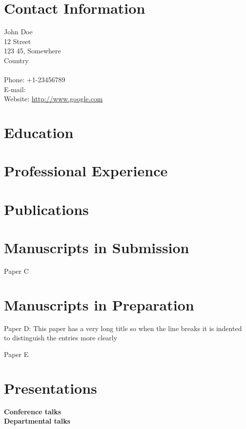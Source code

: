 \documentclass[12pt]{karencv}
\begin{document}
\section{Contact Information}
John Doe\\
12 Street\\
123 45, Somewhere~\\
Country\\~\\
Phone: +1-23456789\\
E-mail: \\
Website: \url{http://www.google.com}


\section{Education}

\section{Professional Experience}

\section{Publications}



\section{Manuscripts in Submission}
Paper C
\section{Manuscripts in Preparation}

\begin{articlelist}
\item Paper D: This paper has a very long title so when the line breaks it is indented to distinguish the entries more clearly
\item Paper E
\end{articlelist}

\section{Presentations}
\textbf{Conference talks}\\
\textbf{Departmental talks}\\
\end{document}
